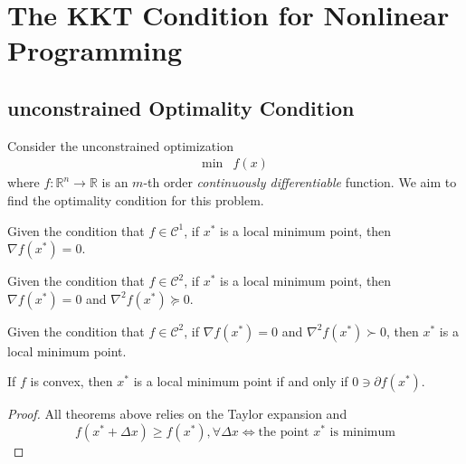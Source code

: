 \chapter{The KKT Condition for Nonlinear Programming}

\section{unconstrained Optimality Condition}
Consider the unconstrained optimization
\begin{equation}
\begin{array}{ll}
\min&f(x)
\end{array}
\end{equation}
where $f:\mathbb{R}^n\to\mathbb{R}$ is an $m$-th order \emph{continuously differentiable} function. We aim to find the optimality condition for this problem.

\begin{theorem}
Given the condition that $f\in\mathcal{C}^1$, if $x^*$ is a local minimum point, then $\nabla f(x^*)=0$.
\end{theorem}
\begin{theorem}
Given the condition that $f\in\mathcal{C}^2$, if $x^*$ is a local minimum point, then $\nabla f(x^*)=0$ and $\nabla^2f(x^*)\succeq0$.
\end{theorem}

\begin{theorem}
Given the condition that $f\in\mathcal{C}^2$, if $\nabla f(x^*)=0$ and $\nabla^2f(x^*)\succ0$, then $x^*$ is a local minimum point.
\end{theorem}

\begin{theorem}
If $f$ is convex, then $x^*$ is a local minimum point if and only if $0\ni\partial f(x^*)$.
\end{theorem}

\begin{proof}
All theorems above relies on the Taylor expansion and 
\[
f(x^*+\Delta x)\ge f(x^*),\forall\Delta x
\Longleftrightarrow
\text{the point $x^*$ is minimum}
\]
\end{proof}


